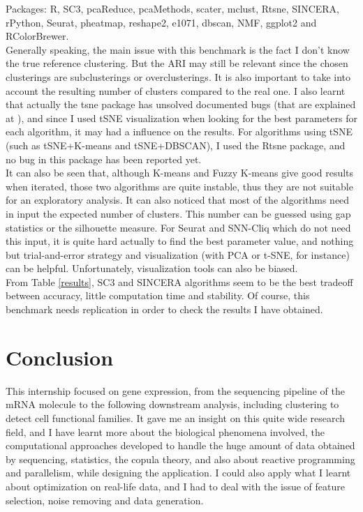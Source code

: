 \documentclass{report}
\begin{document}
{Packages: R\cite{baser}, SC3\cite{sc3r}, pcaReduce\cite{pcareducer}, pcaMethods\cite{pcamethodsr}, scater\cite{scaterr}, mclust\cite{mclustr}, Rtsne\cite{rtsner}, SINCERA\cite{sincerar}, rPython\cite{rpythonr}, Seurat\cite{seuratr}, pheatmap\cite{pheatmapr}, reshape2\cite{reshape2r}, e1071\cite{e1071r}, dbscan\cite{dbscanr}, NMF\cite{nmfr}, ggplot2\cite{ggplot2r} and RColorBrewer\cite{rcolorbrewerr}.\\

Generally speaking, the main issue with this benchmark is the fact I don't know the true reference clustering. But the ARI may still be relevant since the chosen clusterings are subclusterings or overclusterings. It is also important to take into account the resulting number of clusters compared to the real one. I also learnt that actually the tsne package has unsolved documented bugs (that are explained at \cite{tsnebug}), and since I used tSNE visualization when looking for the best parameters for each algorithm, it may had a influence on the results. For algorithms using tSNE (such as tSNE+K-means and tSNE+DBSCAN), I used the Rtsne package, and no bug in this package has been reported yet.\\

It can also be seen that, although K-means and Fuzzy K-means give good results when iterated, those two algorithms are quite instable, thus they are not suitable for an exploratory analysis. It can also noticed that most of the algorithms need in input the expected number of clusters. This number can be guessed using gap statistics\cite{hastie2001estimating} or the silhouette measure\cite{rousseeuw1987silhouettes}. For Seurat and SNN-Cliq which do not need this input, it is quite hard actually to find the best parameter value, and nothing but trial-and-error strategy and visualization (with PCA or t-SNE, for instance) can be helpful. Unfortunately, visualization tools can also be biased\cite{wattenberg2016how}.\\

From Table \ref{results}, SC3 and SINCERA algorithms seem to be the best tradeoff between accuracy, little computation time and stability. Of course, this benchmark needs replication in order to check the results I have obtained.

\chapter{Conclusion}

This internship focused on gene expression, from the sequencing pipeline of the mRNA molecule to the following downstream analysis, including clustering to detect cell functional families. It gave me an insight on this quite wide research field, and I have learnt more about the biological phenomena involved, the computational approaches developed to handle the huge amount of data obtained by sequencing, statistics, the copula theory, and also about reactive programming and parallelism, while designing the application. I could also apply what I learnt about optimization on real-life data, and I had to deal with the issue of feature selection, noise removing and data generation.

}
\end{document}
